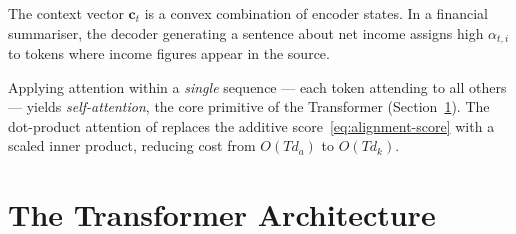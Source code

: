 \begin{deepdive}
The context vector $\mathbf{c}_t$ is a convex combination of encoder states.
In a financial summariser, the decoder generating a sentence about net income assigns
high $\alpha_{t,i}$ to tokens where income figures appear in the source.

Applying attention within a \emph{single} sequence --- each token attending to all
others --- yields \emph{self-attention}, the core primitive of the Transformer
(Section~\ref{sec:transformer}).
The dot-product attention of \citet{vaswani2017attention} %
replaces the additive score~\eqref{eq:alignment-score} with a scaled inner product,
reducing cost from $O(Td_a)$ to $O(Td_k)$.

\end{deepdive}

\section{The Transformer Architecture}
\label{sec:transformer}

